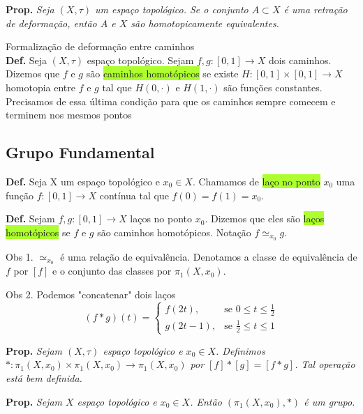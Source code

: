 \documentclass{article}
\begin{document}
\begin{landscape}
\begin{multicols}{3}
\medskip

\textbf{Prop.} \textit{Seja \( (X, \tau) \) um espaço topológico. Se o conjunto \( A \subset X \) é uma retração de deformação, então \( A \) e \( X \) são homotopicamente equivalentes.}\medskip

\colorbox{cinza}{Formalização de deformação entre caminhos}\\
\textbf{Def.} Seja \( (X, \tau) \) espaço topológico. Sejam \( f, g : [0,1] \to X \) dois caminhos. Dizemos que \( f \) e \( g \) são \colorbox{GreenYellow}{caminhos homotópicos} se existe \( H : [0,1] \times [0,1] \to X \) homotopia entre \( f \) e \( g \) tal que \( H(0, \cdot) \) e \( H(1, \cdot) \) são funções constantes.\\
\color{gray}Precisamos de essa última condição para que os caminhos sempre comecem e terminem nos mesmos pontos \color{black}\\
\subsection{Grupo Fundamental}
\textbf{Def.} Seja X um espaço topológico e $x_0 \in X$. Chamamos de \colorbox{GreenYellow}{laço no ponto} $x_0$ uma função $f:[0,1]\to X$ contínua tal que $f(0)=f(1)=x_0$.\medskip

\textbf{Def.} Sejam $f,g: [0,1] \to X$ laços no ponto $x_0$. Dizemos que eles são \colorbox{GreenYellow}{laços homotópicos} se $f$ e $g$ são caminhos homotópicos. \color{gray}Notação $f\simeq_{x_0} g$.\medskip

Obs 1. $\simeq_{x_0}$ é uma relação de equivalência. Denotamos a classe de equivalência de $f$ por $[f]$ e o conjunto das classes por $\pi_{1}(X,x_0)$.\medskip

Obs 2. Podemos "concatenar" dois laços
\begin{equation}
(f * g)(t) = \begin{cases}
f(2t), & \text{se } 0 \leq t \leq \frac{1}{2} \\
g(2t - 1), & \text{se } \frac{1}{2} \leq t \leq 1
\end{cases}
\end{equation}\color{black}

\textbf{Prop.} \textit{Sejam $(X, \tau)$ espaço topológico e $x_0 \in X$. Definimos $* : \pi_1(X, x_0) \times \pi_1(X, x_0) \to \pi_1(X, x_0)$ por $[f] * [g] = [f * g]$. Tal operação está bem definida.} \medskip

\textbf{Prop.} \textit{Sejam $X$ espaço topológico e $x_0\in X$. Então $(\pi_1(X, x_0), *)$ é um grupo.} \medskip


\end{multicols}
\end{landscape}
\end{document}

